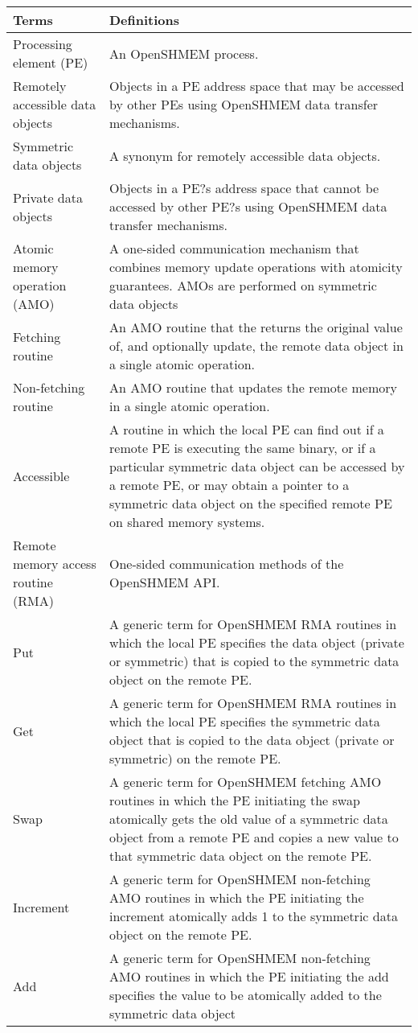 $ $%
\begin{tabular}{|>{\raggedright}p{}|>{\raggedright}p{}|}
\hline 
\textbf{Terms} & \textbf{Definitions}\tabularnewline
\hline 
\hline 
Processing element (PE) & An OpenSHMEM process.\tabularnewline
\hline 
Remotely accessible data objects & Objects in a PE address space that may 
be accessed by other PEs using OpenSHMEM data transfer mechanisms.\tabularnewline
\hline 
Symmetric data objects & A synonym for remotely accessible data objects.\tabularnewline
\hline 
Private data objects & Objects in a PE?s address space that cannot be accessed 
by other PE?s using OpenSHMEM data transfer mechanisms.\tabularnewline
\hline 
Atomic memory operation (AMO) & A one-sided communication mechanism that combines 
memory update operations with atomicity guarantees. AMOs are performed on symmetric 
data objects\tabularnewline
\hline 
Fetching routine & An AMO routine that the returns the original value of, and optionally 
update, the remote data object in a single atomic operation.\tabularnewline
\hline 
Non-fetching routine & An AMO routine that updates the remote memory 
in a single atomic operation.\tabularnewline
\hline
Accessible & A routine in which the local PE can find out if a remote PE is executing the 
same binary, or if a particular symmetric data object can be accessed by a remote PE, 
or may obtain a pointer to a symmetric data object on the specified remote PE on 
shared memory systems.\tabularnewline
\hline
Remote memory access routine (RMA) & One-sided communication 
methods of the OpenSHMEM API.\tabularnewline
\hline
Put & A generic term for OpenSHMEM RMA routines in which the local PE specifies the 
data object (private or symmetric) that is copied to the symmetric data object on the remote 
PE.\tabularnewline
\hline
Get & A generic term for OpenSHMEM RMA routines in which the local PE specifies the 
symmetric data object that is copied to the data object (private or symmetric) on the 
remote PE.\tabularnewline
\hline
Swap & A generic term for OpenSHMEM fetching AMO routines in which the PE initiating 
the swap atomically gets the old value of a symmetric data object from a remote PE and 
copies a new value to that symmetric data object on the remote PE.  \tabularnewline
\hline
Increment & A generic term for OpenSHMEM non-fetching AMO routines in which the PE 
initiating the increment atomically adds 1 to the symmetric data object on the remote 
PE.\tabularnewline
\hline
Add & A generic term for OpenSHMEM non-fetching AMO routines in which the PE 
initiating the add specifies the value to be atomically added to the symmetric data object

\end{tabular}
